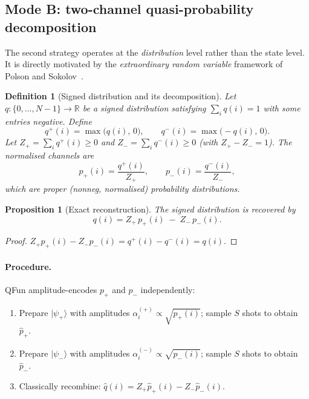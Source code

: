 \documentclass[11pt]{article}
\newtheorem{definition}{Definition}
\newtheorem{proposition}{Proposition}
\newcommand{\ket}[1]{|#1\rangle}
\newcommand{\R}{\mathbb{R}}
\begin{document}
\subsection{Mode B: two-channel quasi-probability decomposition}
\label{sec:modeB}

The second strategy operates at the \emph{distribution} level rather
than the state level.  It is directly motivated by the
\emph{extraordinary random variable} framework of Polson and
Sokolov~\cite{polson2024negative}.

\begin{definition}[Signed distribution and its decomposition]
\label{def:decomp}
Let $q:\{0,\ldots,N-1\}\to\R$ be a signed distribution satisfying
$\sum_i q(i)=1$ with some entries negative.  Define
\begin{equation}\label{eq:qpm}
  q^+(i) = \max\bigl(q(i),\,0\bigr),
  \qquad
  q^-(i) = \max\bigl(-q(i),\,0\bigr).
\end{equation}
Let $Z_+=\sum_i q^+(i)\ge 0$ and $Z_-=\sum_i q^-(i)\ge 0$ (with
$Z_+-Z_-=1$).  The \emph{normalised channels} are
\begin{equation}\label{eq:channels}
  p_+(i) = \frac{q^+(i)}{Z_+},
  \qquad
  p_-(i) = \frac{q^-(i)}{Z_-},
\end{equation}
which are proper (nonneg, normalised) probability distributions.
\end{definition}

\begin{proposition}[Exact reconstruction]\label{prop:recon_B}
The signed distribution is recovered by
\begin{equation}\label{eq:recon_B}
  q(i) = Z_+\,p_+(i) \;-\; Z_-\,p_-(i).
\end{equation}
\end{proposition}
\begin{proof}
$Z_+p_+(i)-Z_-p_-(i) = q^+(i)-q^-(i) = q(i)$.
\end{proof}

\paragraph{Procedure.}
QFun amplitude-encodes $p_+$ and $p_-$ independently:
\begin{enumerate}
  \item Prepare $\ket{\psi_+}$ with amplitudes
        $\alpha_i^{(+)}\propto\sqrt{p_+(i)}$; sample $S$ shots to
        obtain $\hat{p}_+$.
  \item Prepare $\ket{\psi_-}$ with amplitudes
        $\alpha_i^{(-)}\propto\sqrt{p_-(i)}$; sample $S$ shots to
        obtain $\hat{p}_-$.
  \item Classically recombine:
        $\hat{q}(i) = Z_+\hat{p}_+(i) - Z_-\hat{p}_-(i)$.
\end{enumerate}
\end{document}
